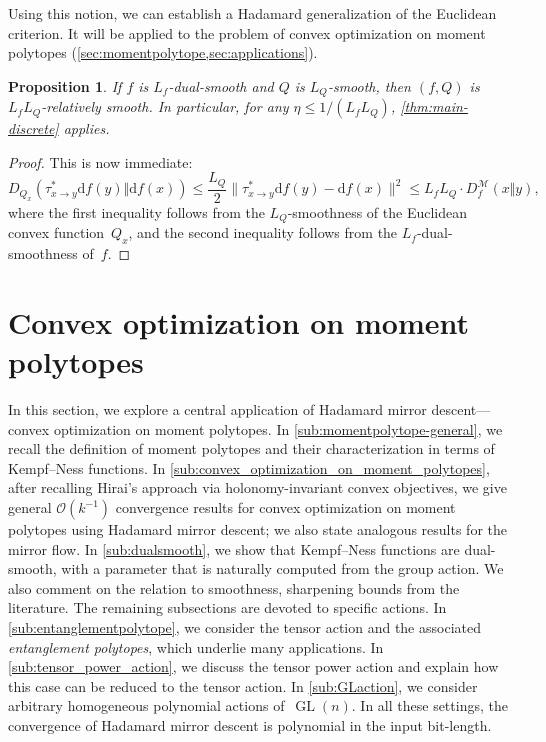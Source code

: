 \documentclass[11pt,letterpaper]{article}
\newtheorem{proposition}[theorem]{Proposition}\AddToHook{env/proposition/begin}{\crefalias{theorem}{proposition}}\crefname{proposition}{Proposition}{Propositions}
\numberwithin{equation}{section}
\newcommand{\diff}{\mathrm{d}}
\newcommand{\MM}{\mathcal{M}}
\DeclareMathOperator{\GL}{GL}
\begin{document}
Using this notion, we can establish a Hadamard generalization of the Euclidean criterion.
It will be applied to the problem of convex optimization on moment polytopes (\cref{sec:momentpolytope,sec:applications}).

\begin{proposition}
\label{prop:dual-to-relative}
    If $f$ is $L_f$-dual-smooth and $Q$ is $L_Q$-smooth, then $(f, Q)$ is $L_f L_Q$-relatively smooth.
    In particular, for any $\eta\leq 1/(L_f L_Q)$, \cref{thm:main-discrete} applies.
\end{proposition}
\begin{proof}
    This is now immediate:
    \begin{equation*}
       D_{Q_x}(\tau^{\ast}_{x\rightarrow y}\diff f(y)\Vert \diff f(x) ) \leq \frac{L_Q}2\|\tau^*_{x\to y}\diff f(y) - \diff f(x)\|^2 \leq L_fL_Q \cdot D_f^{\MM}(x\Vert y),
    \end{equation*}
    where the first inequality follows from the $L_Q$-smoothness of the Euclidean convex function~$Q_x$, and the second inequality follows from the $L_f$-dual-smoothness of~$f$.
\end{proof}

\section{Convex optimization on moment polytopes}\label{sec:momentpolytope}
In this section, we explore a central application of Hadamard mirror descent---convex optimization on moment polytopes.
In \cref{sub:momentpolytope-general}, we recall the definition of moment polytopes and their characterization in terms of Kempf--Ness functions.
In \cref{sub:convex_optimization_on_moment_polytopes}, after recalling Hirai's approach via holonomy-invariant convex objectives, we give general $\mathcal{O}(k^{-1})$ convergence results for convex optimization on moment polytopes using Hadamard mirror descent; we also state analogous results for the mirror flow.
In \cref{sub:dualsmooth}, we show that Kempf--Ness functions are dual-smooth, with a parameter that is naturally computed from the group action.
We also comment on the relation to smoothness, sharpening bounds from the literature.
The remaining subsections are devoted to specific actions.
In \cref{sub:entanglementpolytope}, we consider the tensor action and the associated \emph{entanglement polytopes}, which underlie many applications.
In \cref{sub:tensor_power_action}, we discuss the tensor power action and explain how this case can be reduced to the tensor action.
In \cref{sub:GLaction}, we consider arbitrary homogeneous polynomial actions of~$\GL(n)$.
In all these settings, the convergence of Hadamard mirror descent is polynomial in the input bit-length.
\end{document}
